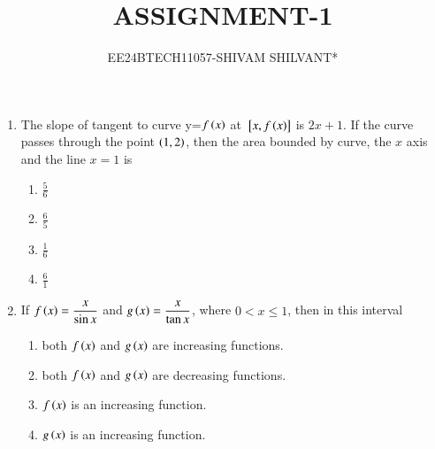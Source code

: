 \documentclass[journal]{IEEEtran}
\begin{document}

\onecolumn


\title{ASSIGNMENT-1}
\author{EE24BTECH11057-SHIVAM SHILVANT*}
\maketitle

\bigskip

\renewcommand{\thefigure}{\theenumi}
\renewcommand{\thetable}{\theenumi}
\begin{enumerate}[start=9]
\item The slope of tangent to curve y=$f\left(x\right)$ at ${}\left[x,f\left(x\right)\right]$ is $2x + 1$. If the curve passes through the point $\left(1,2\right)$, then the area bounded by curve, the $x$ axis and the line $x=1$ is
\hfill {}
\begin{multicols}{4}
\begin{enumerate}
    \item $\displaystyle\frac{5}{6}$\\ 
    \item $\displaystyle\frac{6}{5}$\\
    \item $\displaystyle\frac{1}{6}$\\ 
    \item $\displaystyle\frac{6}{1}$\\
\end{enumerate}
\end{multicols}
\item If $f\left(x\right)=\displaystyle\frac{x}{\sin{x}}$ and $g\left(x\right)=\displaystyle\frac{x}{\tan{x}}$, where $0<x\leq1$, then in this interval
\hfill {}
\begin{enumerate}
    \item both $f\left(x\right)$ and $g\left(x\right)$ are increasing functions.
    \item both $f\left(x\right)$ and $g\left(x\right)$ are decreasing functions.
    \item $f\left(x\right)$ is an increasing function.
    \item $g\left(x\right)$ is an increasing function.\\
\end{enumerate}


\end{enumerate}
\end{document}
